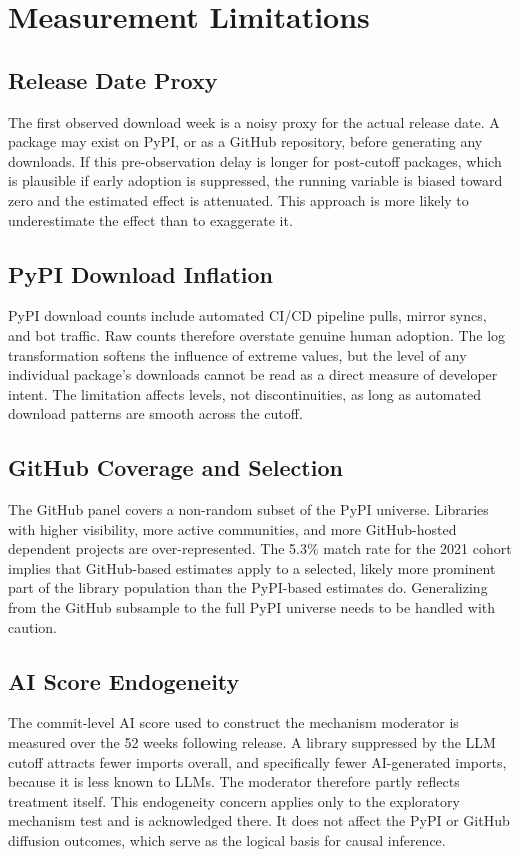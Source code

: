 \documentclass[12pt, a4paper]{report}
\begin{document}
\section{Measurement Limitations}\label{sec:data-limitations}
\subsection{Release Date Proxy}
The first observed download week is a noisy proxy for the actual release date. A package may exist on PyPI, or as a GitHub repository, before generating any downloads. If this pre-observation delay is longer for post-cutoff packages, which is plausible if early adoption is suppressed, the running variable is biased toward zero and the estimated effect is attenuated. This approach is more likely to underestimate the effect than to exaggerate it.

\subsection{PyPI Download Inflation}
PyPI download counts include automated CI/CD pipeline pulls, mirror syncs, and bot traffic. Raw counts therefore overstate genuine human adoption. The log transformation softens the influence of extreme values, but the level of any individual package's downloads cannot be read as a direct measure of developer intent. The limitation affects levels, not discontinuities, as long as automated download patterns are smooth across the cutoff.

\subsection{GitHub Coverage and Selection}
The GitHub panel covers a non-random subset of the PyPI universe. Libraries with higher visibility, more active communities, and more GitHub-hosted dependent projects are over-represented. The 5.3\% match rate for the 2021 cohort implies that GitHub-based estimates apply to a selected,  likely more prominent part of the library population than the PyPI-based estimates do. Generalizing from the GitHub subsample to the full PyPI universe needs to be handled with caution.

\subsection{AI Score Endogeneity}
The commit-level AI score used to construct the mechanism moderator is measured over the 52 weeks following release. A library suppressed by the LLM cutoff attracts fewer imports overall, and specifically fewer AI-generated imports, because it is less known to LLMs. The moderator therefore partly reflects treatment itself. This endogeneity concern applies only to the exploratory mechanism test and is acknowledged there. It does not affect the PyPI or GitHub diffusion outcomes, which serve as the logical basis for causal inference.
\end{document}
